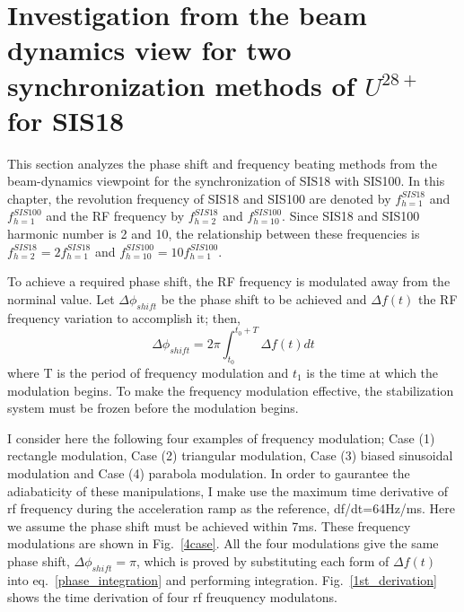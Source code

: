 \section{Investigation from the beam dynamics view for two synchronization methods of $U^{28+}$ for SIS18}
This section analyzes the phase shift and frequency beating methods from the beam-dynamics viewpoint for the synchronization of SIS18 with SIS100. In this chapter, the revolution frequency of SIS18 and SIS100 are denoted by $f_{h=1}^{SIS18}$ and $f_{h=1}^{SIS100}$ and the RF frequency by $f_{h=2}^{SIS18}$ and $f_{h=10}^{SIS100}$. Since SIS18 and SIS100 harmonic number is 2 and 10, the relationship between these frequencies is $f_{h=2}^{SIS18}=2f_{h=1}^{SIS18}$ and $f_{h=10}^{SIS100}=10f_{h=1}^{SIS100}$.

To achieve a required phase shift, the RF frequency is modulated away from the norminal value. Let $\Delta \phi_{shift}$ be the phase shift to be achieved and $\Delta f(t)$ the RF frequency variation to accomplish it; then,
\begin{equation}
\Delta \phi_{shift}= 2\pi \int_{t_0}^{t_0+T} \Delta f(t)dt \label{phase_integration}
\end{equation}
where T is the period of frequency modulation and $t_1$ is the time at which the modulation begins. To make the frequency modulation effective, the stabilization system must be frozen before the modulation begins. 

I consider here the following four examples of frequency modulation; Case (1) rectangle modulation, Case (2) triangular modulation, Case (3) biased sinusoidal modulation and Case (4) parabola modulation. In order to gaurantee the adiabaticity of these manipulations, I make use the maximum time derivative of rf frequency during the acceleration ramp as the reference, df/dt=64Hz/ms. Here we assume the phase shift must be achieved within 7ms. These frequency modulations are shown in Fig.~\ref{4case}. All the four modulations give the same phase shift, $\Delta \phi_{shift}=\pi$, which is
proved by substituting each form of $\Delta f(t)$ into eq.~\ref{phase_integration} and performing integration. Fig.~\ref{1st_derivation} shows the time derivation of four rf freuquency modulatons.

